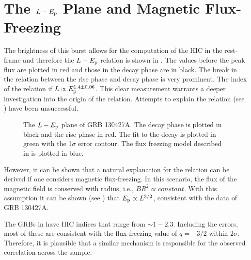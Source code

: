 \section{The  $L-E_{\rm p}$ Plane and Magnetic Flux-Freezing}
\label{sec:fluxfrx}
The brightness of this burst allows for the computation of the HIC in
the rest-frame and therefore the $L-E_{\rm p}$ relation is shown in
. The values before the peak flux are plotted in
red and those in the decay phase are in black. The break in the
relation between the rise phase and decay phase is very prominent. The
index of the relation if $L\propto E_{\rm p}^{1.4\pm 0.06}$. This clear
measurement warrants a deeper investigation into the origin of the
relation. Attempts to explain the relation (see ) have been unsuccessful.  
\begin{figure}[t]
  \centering
  \caption{The $L-E_{\rm p}$ plane of GRB 130427A. The decay phase is
    plotted in black and the rise phase in red. The fit to the decay
    is plotted in green with the 1$\sigma$ error contour. The flux
    freezing model described in  is plotted in
    blue.}
  \label{fig:feep}
\end{figure}
However, it can be shown that a natural explanation for the relation
can be derived if one considers magnetic flux-freezing. In this
scenario, the flux of the magnetic field is conserved with radius,
i.e., $BR^2\propto constant$. With this assumption it can be shown
(see ) that $E_{\rm p}\propto L^{3/2}$, consistent with
the data of GRB 130427A.

The GRBs in  have HIC indices that range from
$\sim 1- 2.3$. Including the errors, most of these are consistent with
the flux-freezing value of $q=-3/2$ within 2$\sigma$. Therefore, it is
plausible that a similar mechanism is responsible for the observed
correlation across the sample. 

